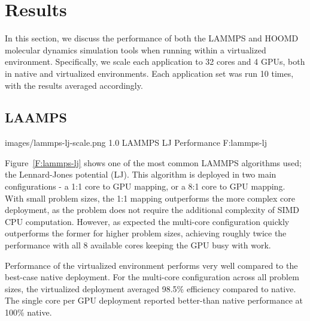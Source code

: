 \documentclass{sigplanconf}
\begin{document}

 
\section{Results}

In this section, we discuss the performance of both the LAMMPS and HOOMD molecular dynamics simulation tools when running within a virtualized environment. Specifically, we scale each application to 32 cores and 4 GPUs, both in native and virtualized environments.  Each application set was run 10 times, with the results averaged accordingly. 

\subsection{LAAMPS}

  {images/lammps-lj-scale.png}
  {1.0}
  {LAMMPS LJ Performance}
  {F:lammps-lj}


Figure~\ref{F:lammps-lj} shows one of the most common LAMMPS algorithms used; the Lennard-Jones potential (LJ).  This algorithm is deployed in two main configurations - a 1:1 core to GPU mapping, or a 8:1 core to GPU mapping.  With small problem sizes, the 1:1 mapping outperforms the more complex core deployment, as the problem does not require the additional complexity of SIMD CPU computation.  However, as expected the multi-core configuration quickly outperforms the former for higher problem sizes, achieving roughly twice the performance with all 8 available cores keeping the GPU busy with work. 

Performance of the virtualized environment performs very well compared to the best-case native deployment. For the multi-core configuration across all problem sizes, the virtualized deployment averaged 98.5\% efficiency compared to native. The single core per GPU deployment reported better-than native performance at 100\% native. 

\end{document}
